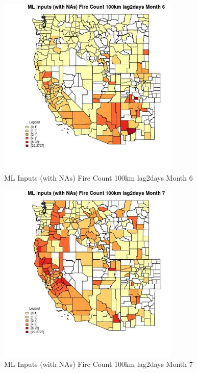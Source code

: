 \begin{figure} 
\centering  
\includegraphics[width=0.77\textwidth]{Code_Outputs/Report_ML_input_PM25_Step4_part_f_de_duplicated_aveswNAs_CountyFire_Count_100km_lag2daysmedianMonth6.jpg} 
\caption{\label{fig:Report_ML_input_PM25_Step4_part_f_de_duplicated_aveswNAsCountyFire_Count_100km_lag2daysmedianMonth6}ML Inputs (with NAs) Fire Count 100km lag2days Month 6} 
\end{figure} 
 

\begin{figure} 
\centering  
\includegraphics[width=0.77\textwidth]{Code_Outputs/Report_ML_input_PM25_Step4_part_f_de_duplicated_aveswNAs_CountyFire_Count_100km_lag2daysmedianMonth7.jpg} 
\caption{\label{fig:Report_ML_input_PM25_Step4_part_f_de_duplicated_aveswNAsCountyFire_Count_100km_lag2daysmedianMonth7}ML Inputs (with NAs) Fire Count 100km lag2days Month 7} 
\end{figure} 
 

